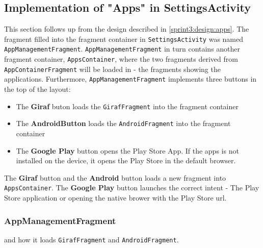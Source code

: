 \subsection{Implementation of "Apps" in SettingsActivity}
This section follows up from the design described in \cref{sprint3:design:apps}.
The fragment filled into the fragment container in \lstinline!SettingsActivity! was named \lstinline!AppManagementFragment!.
\lstinline!AppManagementFragment! in turn contains another fragment container, \lstinline!AppsContainer!, where the two fragments derived from \lstinline!AppContainerFragment! will be loaded in - the fragments showing the applications.
Furthermore, \lstinline!AppManagementFragment! implements three buttons in the top of the layout:

\begin{itemize}
\item The \textbf{Giraf} buton loads the \lstinline!GirafFragment! into the fragment container
\item The \textbf{AndroidButton} loads the \lstinline!AndroidFragment! into the fragment container
\item The \textbf{Google Play} button opens the Play Store App. If the apps is not installed on the device, it opens the Play Store in the default browser.
\end{itemize}

The \textbf{Giraf} button and the \textbf{Android} button loads a new fragment into \lstinline!AppsContainer!.
The \textbf{Google Play} button launches the correct intent - The Play Store application or opening the native brower with the Play Store url.

\subsubsection{AppManagementFragment}

 and how it loads \lstinline!GirafFragment! and  \lstinline!AndroidFragment!.

